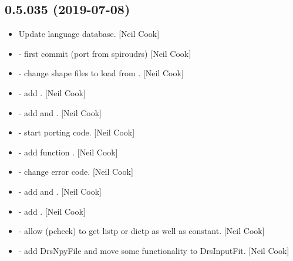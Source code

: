 \documentclass[a4paper,10pt,english]{report}
\begin{document}
\subsection{0.5.035 (2019-07-08)}
\label{\detokenize{misc/changelog:id104}}\begin{itemize}
\item {} 
Update language database. {[}Neil Cook{]}

\item {} 
 - first commit (port from spiroudrs) {[}Neil Cook{]}

\item {} 
 - change shape files to load from
. {[}Neil Cook{]}

\item {} 
 - add . {[}Neil Cook{]}

\item {} 
 - add  and .
{[}Neil Cook{]}

\item {} 
 - start porting code. {[}Neil
Cook{]}

\item {} 
 - add function . {[}Neil Cook{]}

\item {} 
 - change error code. {[}Neil Cook{]}

\item {} 
 - add  and . {[}Neil
Cook{]}

\item {} 
 - add . {[}Neil Cook{]}

\item {} 
 - allow  (pcheck) to get listp or dictp as well
as constant. {[}Neil Cook{]}

\item {} 
 - add DrsNpyFile and move some functionality to
DrsInputFit. {[}Neil Cook{]}


\end{itemize}
\end{document}
